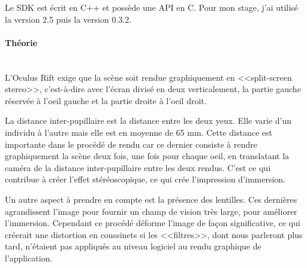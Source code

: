 \documentclass[a4paper,french,12pt]{article}
\begin{document}
			    Le SDK est écrit en C++ et possède une API en C.
			    Pour mon stage, j'ai utilisé la version 2.5 puis la version 0.3.2.
			
			\paragraph{Théorie} ~\\
			
			    L'Oculus Rift exige que la scène soit rendue graphiquement en <<split-screen stereo>>, 
			    c'est-à-dire avec l'écran divisé en deux verticalement, la partie gauche réservée à l'oeil gauche
			    et la partie droite à l'oeil droit.
			    
			    La distance inter-pupillaire est la distance entre les deux yeux. Elle varie d'un individu
			    à l'autre mais elle est en moyenne de 65 mm. Cette distance est importante dans le procédé 
			    de rendu car ce dernier consiste à rendre graphiquement la scène deux fois, une fois pour
			    chaque oeil, en translatant la caméra de la distance inter-pupillaire entre les deux rendus.
			    C'est ce qui contribue à créer l'effet stéréoscopique, ce qui crée l'impression d'immersion.
			
			    Un autre aspect à prendre en compte est la présence des lentilles. Ces dernières agrandissent
			    l'image pour fournir un champ de vision très large, pour améliorer l'immersion.
			    Cependant ce procédé déforme l'image de façon significative, ce qui créerait une distortion
			    en coussinets si les <<filtres>>, dont nous parleront plus tard,
			    n'étaient pas appliqués au niveau logiciel au rendu graphique de l'application.\\
			    
\end{document}
